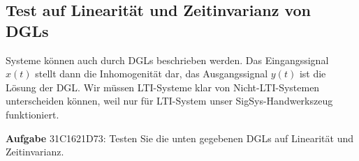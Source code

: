 \subsection{Test auf Linearität und Zeitinvarianz von DGLs}
\label{sec:31C1621D73}
\begin{Ziel}
Systeme können auch durch DGLs beschrieben werden. Das Eingangssignal $x(t)$
stellt dann die Inhomogenität dar, das Ausgangssignal $y(t)$ ist die Lösung der DGL.
%
Wir müssen LTI-Systeme klar von Nicht-LTI-Systemen unterscheiden können, weil
nur für LTI-System unser SigSys-Handwerkszeug funktioniert.
\end{Ziel}
\textbf{Aufgabe} {\tiny 31C1621D73}: Testen Sie die unten gegebenen DGLs auf
Linearität und Zeitinvarianz.
